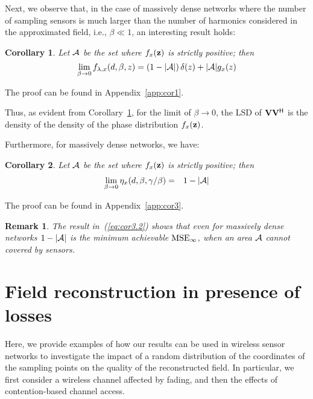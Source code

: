 \documentclass[11pt, draftcls, onecolumn, a4paper]{IEEEtran}
\newtheorem{corollary}{Corollary}[section]
\newtheorem{remark}{Remark}[section]
\newcommand{\zv}{{\bf z}}
\newcommand{\Vm}{{\bf V}}
\def\MSEinf{{\rm MSE}_{\infty}}
\newcommand{\Ac}{{\cal A}}
\def\Herm{\mathsf{^H}}
\begin{document}
Next, we observe that, in the case of massively dense networks
where the number of sampling sensors is much larger than the number of
harmonics considered in the approximated field, i.e., $\beta \ll 1$,
an interesting result holds:
\begin{corollary}
\label{cor1}
Let $\Ac$ be the set where $f_{x}(\zv)$ is strictly positive; then
\begin{equation}
 \lim_{\beta\rightarrow 0} f_{\lambda,x}(d,\beta,z) = \left(1-|\Ac|\right)\delta(z)+ |\Ac| g_x(z)
 \label{eq:cor1}
\end{equation}
\end{corollary}
\begin{IEEEproof}
The proof can be found in Appendix~\ref{app:cor1}.
\end{IEEEproof}
Thus, as evident from 
Corollary~\ref{cor1}, for the limit of $\beta
\rightarrow 0$, the LSD of $\Vm\Vm\Herm$ is the density of the density
of the phase distribution $f_x(\zv)$.


Furthermore, for massively dense networks, we have:
\begin{corollary}
\label{cor3}
Let $\Ac$ be the set where $f_{x}(\zv)$ is strictly positive; then 
\begin{eqnarray} 
\lim_{\beta\rightarrow 0} \eta_x(d,\beta,\gamma/\beta) &=& 1-|\Ac| \label{eq:cor3.2}
\end{eqnarray}
\end{corollary}
\begin{IEEEproof}
The proof can be found in Appendix~\ref{app:cor3}.
\end{IEEEproof}
\begin{remark}
The result in~(\ref{eq:cor3.2}) shows that even for massively dense
networks $1-|\Ac|$ is the minimum achievable $\MSEinf$, when an area
$\Ac$ cannot covered by sensors.
\end{remark}




\section{Field reconstruction in presence of losses\label{sec:applications}}


Here, we provide examples of how our results can be used in 
wireless sensor networks to 
investigate the impact of a random distribution of the coordinates
of the sampling points on the quality of the reconstructed field. 
In particular, we first consider a wireless channel 
affected by fading, and then  the effects of contention-based
channel access.
\end{document}
